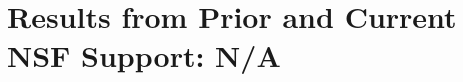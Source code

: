 \documentclass[11pt]{article}
\begin{document}



\section{Results from Prior and Current NSF Support: N/A}


\newpage
\setcounter{page}{1}

%

\end{document}
